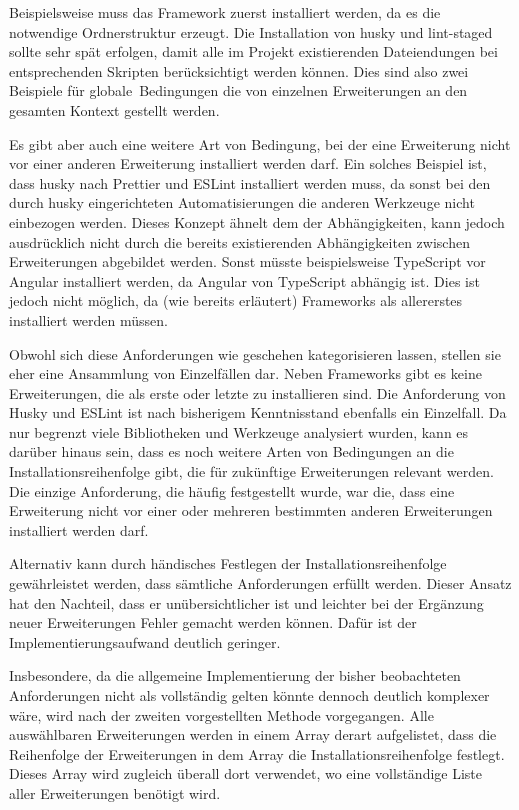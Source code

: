 Beispielsweise muss das Framework zuerst installiert werden, da es die notwendige Ordnerstruktur erzeugt. Die Installation von husky und lint-staged sollte sehr spät erfolgen, damit alle im Projekt existierenden Dateiendungen bei entsprechenden Skripten berücksichtigt werden können. Dies sind also zwei Beispiele für \glqq globale\grqq\ Bedingungen die von einzelnen Erweiterungen an den gesamten Kontext gestellt werden.

Es gibt aber auch eine weitere Art von Bedingung, bei der eine Erweiterung nicht vor einer anderen Erweiterung installiert werden darf. Ein solches Beispiel ist, dass husky nach Prettier und ESLint installiert werden muss, da sonst bei den durch husky eingerichteten Automatisierungen die anderen Werkzeuge nicht einbezogen werden. Dieses Konzept ähnelt dem der Abhängigkeiten, kann jedoch ausdrücklich nicht durch die bereits existierenden Abhängigkeiten zwischen Erweiterungen abgebildet werden. Sonst müsste beispielsweise TypeScript vor Angular installiert werden, da Angular von TypeScript abhängig ist. Dies ist jedoch nicht möglich, da (wie bereits erläutert) Frameworks als allererstes installiert werden müssen.

Obwohl sich diese Anforderungen wie geschehen kategorisieren lassen, stellen sie eher eine Ansammlung von Einzelfällen dar. Neben Frameworks gibt es keine Erweiterungen, die als erste oder letzte zu installieren sind. Die Anforderung von Husky und ESLint ist nach bisherigem Kenntnisstand ebenfalls ein Einzelfall. Da nur begrenzt viele Bibliotheken und Werkzeuge analysiert wurden, kann es darüber hinaus sein, dass es noch weitere Arten von Bedingungen an die Installationsreihenfolge gibt, die für zukünftige Erweiterungen relevant werden. Die einzige Anforderung, die häufig festgestellt wurde, war die, dass eine Erweiterung nicht vor einer oder mehreren bestimmten anderen Erweiterungen installiert werden darf.

Alternativ kann durch händisches Festlegen der Installationsreihenfolge gewährleistet werden, dass sämtliche Anforderungen erfüllt werden. Dieser Ansatz hat den Nachteil, dass er unübersichtlicher ist und leichter bei der Ergänzung neuer Erweiterungen Fehler gemacht werden können. Dafür ist der Implementierungsaufwand deutlich geringer.

Insbesondere, da die allgemeine Implementierung der bisher beobachteten Anforderungen nicht als vollständig gelten könnte dennoch deutlich komplexer wäre, wird nach der zweiten vorgestellten Methode vorgegangen. Alle auswählbaren Erweiterungen werden in einem Array derart aufgelistet, dass die Reihenfolge der Erweiterungen in dem Array die Installationsreihenfolge festlegt. Dieses Array wird zugleich überall dort verwendet, wo eine vollständige Liste aller Erweiterungen benötigt wird.

